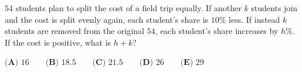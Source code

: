 $54$ students plan to split the cost of a field trip equally. If another $k$ students join and the cost is split evenly again, each student's share is $10\%$ less. If instead $k$ students are removed from the original $54$, each student's share increases by $h\%$. If the cost is positive, what is $h+k$?

$\textbf{(A) }16\qquad\textbf{(B) }18.5\qquad\textbf{(C) }21.5\qquad\textbf{(D) }26\qquad\textbf{(E) }29$
